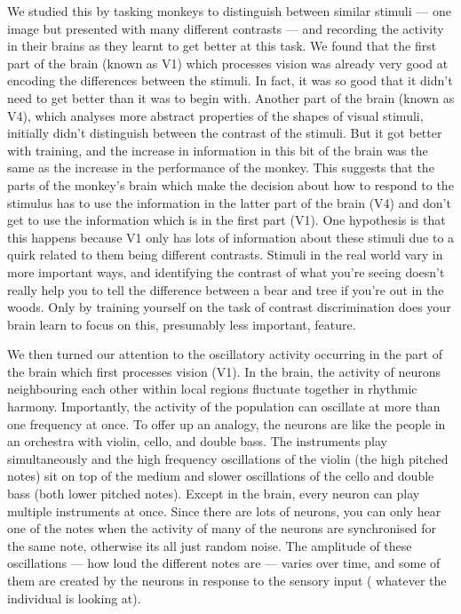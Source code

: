 We studied this by tasking monkeys to distinguish between similar stimuli --- one image but presented with many different contrasts --- and recording the activity in their brains as they learnt to get better at this task.
We found that the first part of the brain (known as \acs{V1}) which processes vision was already very good at encoding the differences between the stimuli.
In fact, it was so good that it didn't need to get better than it was to begin with.
Another part of the brain (known as \acs{V4}), which analyses more abstract properties of the shapes of visual stimuli, initially didn't distinguish between the contrast of the stimuli.
But it got better with training, and the increase in information in this bit of the brain was the same as the increase in the performance of the monkey.
This suggests that the parts of the monkey's brain which make the decision about how to respond to the stimulus has to use the information in the latter part of the brain (\acs{V4}) and don't get to use the information which is in the first part (\acs{V1}).
One hypothesis is that this happens because \acs{V1} only has lots of information about these stimuli due to a quirk related to them being different contrasts.
Stimuli in the real world vary in more important ways, and identifying the contrast of what you're seeing doesn't really help you to tell the difference between a bear and tree if you're out in the woods.
Only by training yourself on the task of contrast discrimination does your brain learn to focus on this, presumably less important, feature.


We then turned our attention to the oscillatory activity occurring in the part of the brain which first processes vision (\acs{V1}).
In the brain, the activity of neurons neighbouring each other within local regions fluctuate together in rhythmic harmony.
Importantly, the activity of the population can oscillate at more than one frequency at once.
To offer up an analogy, the neurons are like the people in an orchestra with violin, cello, and double bass.
The instruments play simultaneously and the high frequency oscillations of the violin (the high pitched notes) sit on top of the medium and slower oscillations of the cello and double bass (both lower pitched notes).
Except in the brain, every neuron can play multiple instruments at once.
Since there are lots of neurons, you can only hear one of the notes when the activity of many of the neurons are synchronised for the same note, otherwise its all just random noise.
The amplitude of these oscillations --- how loud the different notes are --- varies over time, and some of them are created by the neurons in response to the sensory input (\ie{} whatever the individual is looking at).

